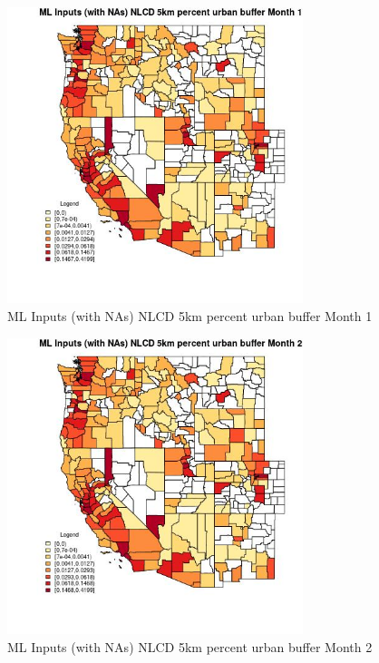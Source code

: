 \begin{figure} 
\centering  
\includegraphics[width=0.77\textwidth]{Code_Outputs/Report_ML_input_PM25_Step4_part_e_de_duplicated_aves_compiled_2019-05-21wNAs_CountyNLCD_5km_percent_urban_buffermedianMonth1.jpg} 
\caption{\label{fig:Report_ML_input_PM25_Step4_part_e_de_duplicated_aves_compiled_2019-05-21wNAsCountyNLCD_5km_percent_urban_buffermedianMonth1}ML Inputs (with NAs) NLCD 5km percent urban buffer Month 1} 
\end{figure} 
 

\begin{figure} 
\centering  
\includegraphics[width=0.77\textwidth]{Code_Outputs/Report_ML_input_PM25_Step4_part_e_de_duplicated_aves_compiled_2019-05-21wNAs_CountyNLCD_5km_percent_urban_buffermedianMonth2.jpg} 
\caption{\label{fig:Report_ML_input_PM25_Step4_part_e_de_duplicated_aves_compiled_2019-05-21wNAsCountyNLCD_5km_percent_urban_buffermedianMonth2}ML Inputs (with NAs) NLCD 5km percent urban buffer Month 2} 
\end{figure} 
 

